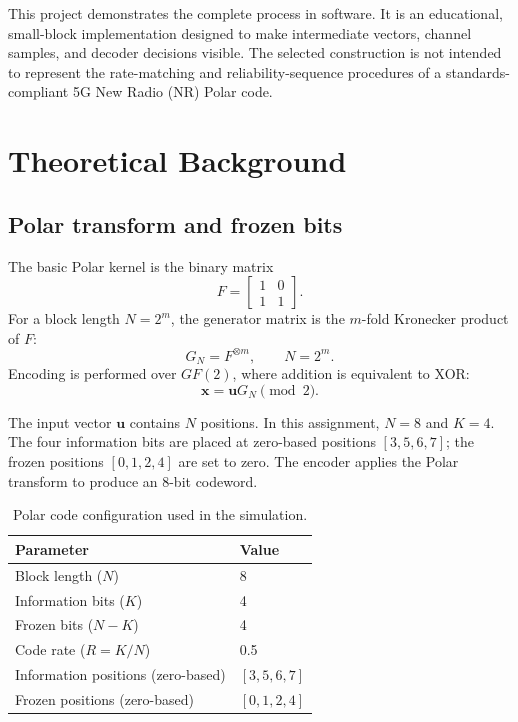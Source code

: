 \documentclass[12pt,a4paper]{article}
\begin{document}
This project demonstrates the complete process in software. It is an educational, small-block implementation designed to make intermediate vectors, channel samples, and decoder decisions visible. The selected construction is not intended to represent the rate-matching and reliability-sequence procedures of a standards-compliant 5G New Radio (NR) Polar code.

\section{Theoretical Background}
\subsection{Polar transform and frozen bits}
The basic Polar kernel is the binary matrix
\begin{equation}
  F = \begin{bmatrix} 1 & 0 \\ 1 & 1 \end{bmatrix}.
  \label{eq:kernel}
\end{equation}
For a block length $N=2^m$, the generator matrix is the $m$-fold Kronecker product of $F$:
\begin{equation}
  G_N = F^{\otimes m}, \qquad N=2^m.
  \label{eq:generator}
\end{equation}
Encoding is performed over $GF(2)$, where addition is equivalent to XOR:
\begin{equation}
  \mathbf{x}=\mathbf{u}G_N\pmod 2.
  \label{eq:encoding}
\end{equation}

The input vector $\mathbf{u}$ contains $N$ positions. In this assignment, $N=8$ and $K=4$. The four information bits are placed at zero-based positions $[3,5,6,7]$; the frozen positions $[0,1,2,4]$ are set to zero. The encoder applies the Polar transform to produce an 8-bit codeword.

\begin{table}[H]
\centering
\caption{Polar code configuration used in the simulation.}
\label{tab:codeparams}
\begin{tabularx}{0.82\linewidth}{lY}
\toprule
\textbf{Parameter} & \textbf{Value}\\
\midrule
Block length ($N$) & 8\\
Information bits ($K$) & 4\\
Frozen bits ($N-K$) & 4\\
Code rate ($R=K/N$) & 0.5\\
Information positions (zero-based) & $[3,5,6,7]$\\
Frozen positions (zero-based) & $[0,1,2,4]$\\
\bottomrule
\end{tabularx}
\end{table}
\end{document}
